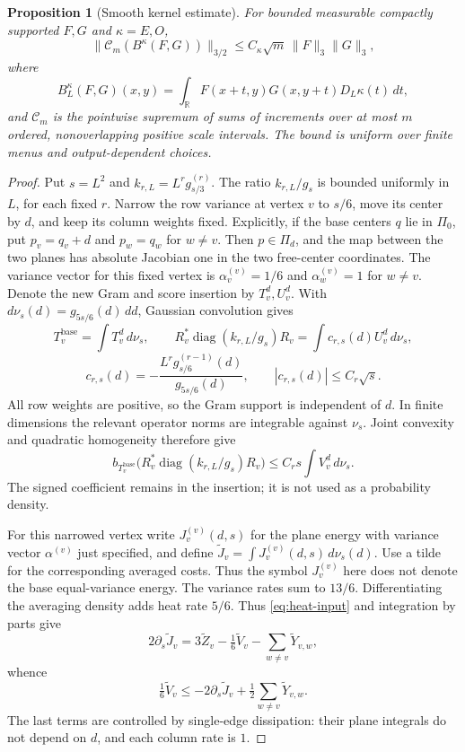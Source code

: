 \documentclass[11pt,a4paper]{article}
\newtheorem{proposition}[theorem]{Proposition}
\theoremstyle{definition}
\newenvironment{statementframe}
  {\par\addvspace{4pt}\noindent
   \setlength{\fboxsep}{6pt}\setlength{\fboxrule}{0.45pt}%
   \begin{lrbox}{\statementbox}%
   \begin{minipage}{\dimexpr\linewidth-2\fboxsep-2\fboxrule\relax}}
  {\end{minipage}\end{lrbox}%
   \fbox{\usebox{\statementbox}}\par\addvspace{4pt}}
\newcommand{\R}{\mathbb R}
\newcommand{\1}{\mathbf1}
\begin{document}
\begin{statementframe}
\begin{proposition}[Smooth kernel estimate]\label{prop:smooth}
For bounded measurable compactly supported $F,G$ and $\kappa=E,O$,
\begin{equation}\label{eq:smooth}
 \|\mathcal C_m(B^\kappa(F,G))\|_{3/2}
 \le C_\kappa\sqrt m\,\|F\|_3\|G\|_3,
\end{equation}
where
\[
 B_L^\kappa(F,G)(x,y)=\int_\R F(x+t,y)G(x,y+t)D_L\kappa(t)\,dt,
\]
and $\mathcal C_m$ is the pointwise supremum of sums of increments over
at most $m$ ordered, nonoverlapping positive scale intervals. The bound
is uniform over finite menus and output-dependent choices.
\end{proposition}
\end{statementframe}
\begin{proof}
Put $s=L^2$ and $k_{r,L}=L^r g_{s/3}^{(r)}$. The ratio
$k_{r,L}/g_s$ is bounded uniformly in $L$, for each fixed $r$.
Narrow the row variance at vertex $v$ to $s/6$, move its center by $d$,
and keep its column weights fixed. Explicitly, if the base centers
$q$ lie in $\Pi_0$, put $p_v=q_v+d$ and $p_w=q_w$ for $w\ne v$.
Then $p\in\Pi_d$, and the map between the two planes has absolute
Jacobian one in the two free-center coordinates. The variance vector
for this fixed vertex is
$\alpha^{(v)}_v=1/6$ and $\alpha^{(v)}_w=1$ for $w\ne v$.
Denote the new Gram and score insertion by $T_v^d,U_v^d$. With $d\nu_s(d)=g_{5s/6}(d)\,dd$, Gaussian
convolution gives
\[
 T_v^{\mathrm{base}}=\int T_v^d\,d\nu_s,
 \qquad R_v^*\operatorname{diag}(k_{r,L}/g_s)R_v
       =\int c_{r,s}(d)U_v^d\,d\nu_s,
\]
\[
 c_{r,s}(d)=-\frac{L^r g_{s/6}^{(r-1)}(d)}{g_{5s/6}(d)},
 \qquad |c_{r,s}(d)|\le C_r\sqrt s.
\]
All row weights are positive, so the Gram support is independent of
$d$. In finite dimensions the relevant operator norms are integrable
against $\nu_s$. Joint convexity and quadratic homogeneity therefore give
\begin{equation}\label{eq:score}
 b_{T_v^{\mathrm{base}}}\bigl(R_v^*\operatorname{diag}(k_{r,L}/g_s)R_v\bigr)
 \le C_rs\int V_v^d\,d\nu_s.
\end{equation}
The signed coefficient remains in the insertion; it is not used as a
probability density.

For this narrowed vertex write $J_v^{(v)}(d,s)$ for the plane energy
with variance vector $\alpha^{(v)}$ just specified, and define
$\widetilde J_v=\int J_v^{(v)}(d,s)\,d\nu_s(d)$.
Use a tilde for the corresponding averaged costs. Thus the symbol
$J_v^{(v)}$ here does not denote the base equal-variance energy. The variance rates
sum to $13/6$. Differentiating the averaging density adds heat rate
$5/6$. Thus \eqref{eq:heat-input} and integration by parts give
\[
 2\partial_s\widetilde J_v
 =3\widetilde Z_v-\tfrac16\widetilde V_v-\sum_{w\ne v}\widetilde Y_{v,w},
\]
whence
\begin{equation}\label{eq:averaged-energy}
 \tfrac16\widetilde V_v
 \le-2\partial_s\widetilde J_v+\tfrac12\sum_{w\ne v}\widetilde Y_{v,w}.
\end{equation}
The last terms are controlled by single-edge dissipation: their plane
integrals do not depend on $d$, and each column rate is $1$.


\end{proof}
\end{document}
